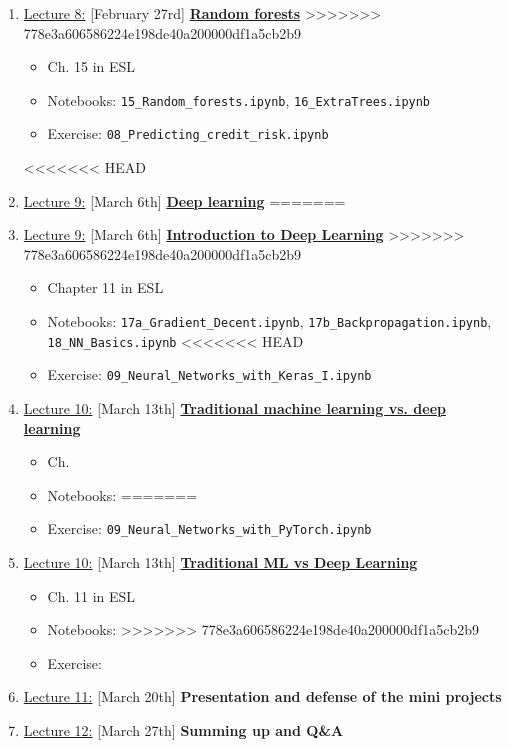 \documentclass[12pt, a4paper]{article}
\begin{document}
\begin{enumerate}
=======
  \item[] \underline{Lecture 8:} [February 27rd] \underline{\bf Random forests}
>>>>>>> 778e3a606586224e198de40a200000df1a5cb2b9
    {\small
      \begin{itemize}
        \item Ch. 15 in ESL
        \item Notebooks: \texttt{15\_Random\_forests.ipynb}, \texttt{16\_ExtraTrees.ipynb}
        \item Exercise: \texttt{08\_Predicting\_credit\_risk.ipynb}
      \end{itemize}
    }
<<<<<<< HEAD
  \item[] \underline{Lecture 9:} [March 6th] \underline{\bf Deep learning}
=======
  \item[] \underline{Lecture 9:} [March 6th] \underline{\bf Introduction to Deep Learning}
>>>>>>> 778e3a606586224e198de40a200000df1a5cb2b9
    {\small
      \begin{itemize}
        \item Chapter 11 in ESL
        \item Notebooks: \texttt{17a\_Gradient\_Decent.ipynb}, \texttt{17b\_Backpropagation.ipynb}, \texttt{18\_NN\_Basics.ipynb}
<<<<<<< HEAD
        \item Exercise: \texttt{09\_Neural\_Networks\_with\_Keras\_I.ipynb}
      \end{itemize}
    }
  \item[] \underline{Lecture 10:} [March 13th] \underline{\bf Traditional machine learning vs. deep learning}
    {\small
      \begin{itemize}
        \item Ch.
        \item Notebooks:
=======
        \item Exercise: \texttt{09\_Neural\_Networks\_with\_PyTorch.ipynb}
      \end{itemize}
    }
  \item[] \underline{Lecture 10:} [March 13th] \underline{\bf Traditional ML vs Deep Learning}
    {\small
      \begin{itemize}
        \item Ch. 11 in ESL
        \item Notebooks: 
>>>>>>> 778e3a606586224e198de40a200000df1a5cb2b9
        \item Exercise:
      \end{itemize}
    }
  \item[] \underline{Lecture 11:} [March 20th] {\bf Presentation and defense of the mini projects}
  \item[] \underline{Lecture 12:} [March 27th] {\bf Summing up and Q\&A}
\end{enumerate}
\end{document}
